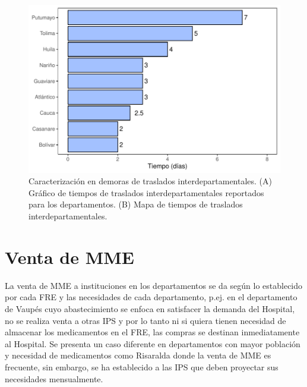 \documentclass[
]{book}
\begin{document}
\begin{figure}[t]

{\centering \includegraphics[width=1\linewidth]{InformeFinal_files/figure-latex/TiemposTranslados-1} 

}

\caption{Caracterización en demoras de traslados interdepartamentales. (A) Gráfico de tiempos de traslados interdepartamentales reportados para los departamentos. (B) Mapa de tiempos de traslados interdepartamentales.}\label{fig:TiemposTranslados}
\end{figure}

\hypertarget{venta-de-mme}{%
\section{Venta de MME}\label{venta-de-mme}}


La venta de MME a instituciones en los departamentos se da según lo establecido por cada FRE y las necesidades de cada departamento, p.ej. en el departamento de Vaupés cuyo abastecimiento se enfoca en satisfacer la demanda del Hospital, no se realiza venta a otras IPS y por lo tanto ni si quiera tienen necesidad de almacenar los medicamentos en el FRE, las compras se destinan inmediatamente al Hospital. Se presenta un caso diferente en departamentos con mayor población y necesidad de medicamentos como Risaralda donde la venta de MME es frecuente, sin embargo, se ha establecido a las IPS que deben proyectar sus necesidades mensualmente.
\end{document}
